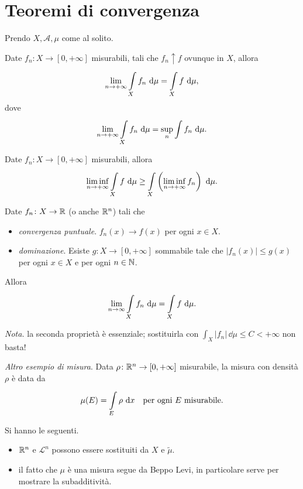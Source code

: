 \documentclass[a4paper, 12pt]{report}
\begin{document}
\section{Teoremi di convergenza}
Prendo $X, \mathcal{A}, \mu$ come al solito.

\begin{teorema}
Date $f_n \colon  X \to [0,+\infty]$ misurabili, tali che $f_n \uparrow f$ ovunque in $X$, allora
\[
	\lim_{n \to +\infty} \int\limits_{\mathclap{X}}^{} f_n \, \dd \mu = \int\limits_X f \, \dd \mu,
\] 
dove
\[
	\lim_{n \to +\infty} \int\limits_{\mathclap{X}}^{} f_n \, \dd \mu = \sup_n \int f_n \, \dd \mu.
\] 
\end{teorema}

\begin{teorema}
Date $f_n \colon X \to [0,+\infty]$ misurabili, allora
\[
	\liminf_{n \to +\infty} \int\limits_X f \, \dd \mu \geq \int\limits_{\mathclap{X}}^{} \left( \liminf_{n \to +\infty} f_n \right) \, \dd \mu.
\] 
\end{teorema}

\begin{teorema}
Date $f_n \colon  X \to \mathbb R$ (o anche $\mathbb R^n$) tali che

\begin{itemize}
	\item[] \textit{convergenza puntuale}. $f_n (x) \to f(x)$ per ogni $x \in X$.
	\item[] \textit{dominazione}. Esiste $g \colon X \to [0,+\infty]$ sommabile tale che $\left| f_n (x) \right| \leq g(x)$ per ogni $x \in X$ e per ogni $n \in \mathbb N$.
\end{itemize}
Allora
\[
	\lim_{n \to \infty} \int\limits_{\mathclap{X}}^{} f_n \, \dd \mu = \int\limits_X f \, \dd \mu. 
\] 
\end{teorema}

\textit{Nota.}
la seconda proprietà è essenziale; sostituirla con $\int_X \left| f_n \right| \, \dd \mu \leq C < + \infty$ non basta!


\textit{Altro esempio di misura}. Data $\rho \colon  \mathbb R^n \to [0,+\infty]$ misurabile, la misura con densità $\rho$ è data da
\[
\mu(E) = \int\limits_{\mathclap{E}}^{} \rho \, \dd x \quad \text{per ogni} \ E \ \text{misurabile}.
\] 

\begin{osservazione}
Si hanno le seguenti.
\begin{itemize}
	\item $\mathbb R^n$ e $\mathscr L^n$ possono essere sostituiti da $X$ e $\widetilde{\mu}$.
	\item il fatto che $\mu$ è una misura segue da Beppo Levi, in particolare serve per mostrare la subadditività.
\end{itemize}
\end{osservazione}
\end{document}
